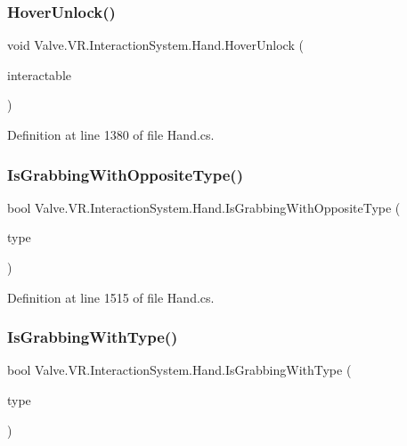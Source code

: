 \subsubsection{\texorpdfstring{HoverUnlock()}{HoverUnlock()}}
{\footnotesize\ttfamily void Valve.\+V\+R.\+Interaction\+System.\+Hand.\+Hover\+Unlock (\begin{DoxyParamCaption}\item[{\mbox{\hyperlink{class_valve_1_1_v_r_1_1_interaction_system_1_1_interactable}{Interactable}}}]{interactable }\end{DoxyParamCaption})}



Definition at line 1380 of file Hand.\+cs.

\mbox{\label{class_valve_1_1_v_r_1_1_interaction_system_1_1_hand_af1cc27ee298744bab84a74e7f69a266c}} 
\subsubsection{\texorpdfstring{IsGrabbingWithOppositeType()}{IsGrabbingWithOppositeType()}}
{\footnotesize\ttfamily bool Valve.\+V\+R.\+Interaction\+System.\+Hand.\+Is\+Grabbing\+With\+Opposite\+Type (\begin{DoxyParamCaption}\item[{\mbox{\hyperlink{namespace_valve_1_1_v_r_1_1_interaction_system_ae03ab84d315f5997fd000817bfb96a0f}{Grab\+Types}}}]{type }\end{DoxyParamCaption})}



Definition at line 1515 of file Hand.\+cs.

\mbox{\label{class_valve_1_1_v_r_1_1_interaction_system_1_1_hand_ac642ffef19ad03b4133a8ea5f3f15214}} 
\subsubsection{\texorpdfstring{IsGrabbingWithType()}{IsGrabbingWithType()}}
{\footnotesize\ttfamily bool Valve.\+V\+R.\+Interaction\+System.\+Hand.\+Is\+Grabbing\+With\+Type (\begin{DoxyParamCaption}\item[{\mbox{\hyperlink{namespace_valve_1_1_v_r_1_1_interaction_system_ae03ab84d315f5997fd000817bfb96a0f}{Grab\+Types}}}]{type }\end{DoxyParamCaption})}



